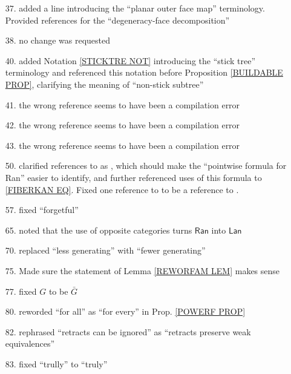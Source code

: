 \documentclass{article}
\begin{document}
\begin{itemize}
\item[37.] added a line introducing the ``planar outer face map'' terminology. Provided references for the ``degeneracy-face decomposition'' 

\item[38.] no change was requested

\item[40.] added Notation \ref{STICKTRE NOT} introducing the ``stick tree'' terminology and referenced this notation before
Proposition \ref{BUILDABLE PROP},
clarifying the meaning of ``non-stick subtree''

\item[41.] the wrong reference seems to have been a compilation error

\item[42.] the wrong reference seems to have been a compilation error

\item[43.] the wrong reference seems to have been a compilation error

\item[50.] clarified references to \cite[X.3.1]{McL} as \cite[X.3 Thm. 1]{McL}, which should make the ``pointwise formula for Ran'' easier to identify, and further referenced uses of this formula to \eqref{FIBERKAN EQ}.
Fixed one reference to \cite[X.3.1]{McL}
to be a reference to \cite[IX.3]{McL}.


\item[57.] fixed ``forgetful''

\item[65.] noted that the use of opposite categories turns $\mathsf{Ran}$ into $\mathsf{Lan}$

\item[70.] replaced ``less generating'' with ``fewer generating''

\item[75.] Made sure the statement of Lemma \ref{REWORFAM LEM} makes sense

\item[77.] fixed $G$ to be $\bar{G}$

\item[80.] reworded ``for all'' as ``for every'' in Prop. \ref{POWERF PROP}

\item[82.] rephrased ``retracts can be ignored''
as ``retracts preserve weak equivalences''

\item[83.] fixed ``trully'' to ``truly''


\end{itemize}
\end{document}
